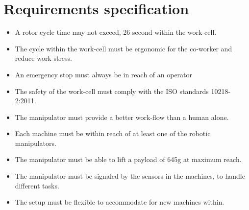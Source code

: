 \chapter{Requirements specification} \label{ch:IdealReq}

\begin{itemize}
    \item A rotor cycle time may not exceed, 26 second within the work-cell.
    \item The cycle within the work-cell must be ergonomic for the co-worker and reduce work-stress.
    \item An emergency stop must always be in reach of an operator
    \item The safety of the work-cell must comply with the ISO standards 10218-2:2011.
    \item The manipulator must provide a better work-flow than a human alone.
    \item Each machine must be within reach of at least one of the robotic manipulators.
    \item The manipulator must be able to lift a payload of 645g at maximum reach.
    \item The manipulator must be signaled by the sensors in the machines, to handle different tasks.
    \item The setup must be flexible to accommodate for new machines within.

\end{itemize}
